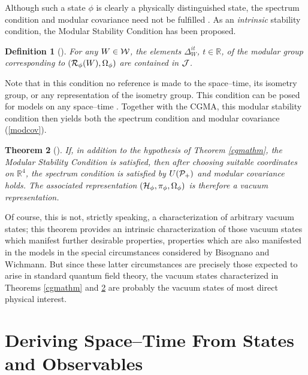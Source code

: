 \documentclass[12pt]{article}
\newtheorem{theorem}{Theorem}[section]
\newtheorem{definition}[theorem]{Definition}
\def\Hs{{\cal H}}
\def\Js{{\cal J}}
\def\Ps{{\cal P}}
\def\Rs{{\cal R}}
\def\Ws{{\cal W}}
\def\RR{{\mathbb R}}
\begin{document}
     Although such a state $\phi$ is clearly a physically
distinguished state, the spectrum condition and modular covariance
need not be fulfilled \cite{BDFS}.  As an {\it intrinsic} stability
condition, the Modular Stability Condition has been proposed.

\begin{definition} [\cite{BDFS}]
For any $W \in \Ws$, the elements $\Delta_W^{it}$, $t \in \RR$,
of the modular group corresponding to $(\Rs_\phi(W),\Omega_\phi)$
are contained in $\Js$.
\end{definition}

     Note that in this condition no reference is made to the
space--time, its isometry group, or any representation of the isometry
group.  This condition can be posed for models on any space--time
\cite{BDFS}. Together with the CGMA, this modular stability condition
then yields both the spectrum condition and modular covariance
(\ref{modcov}).

\begin{theorem} [\cite{BDFS,BS3}] \label{mscthm}
If, in addition to the hypothesis of Theorem \ref{cgmathm}, the Modular 
Stability Condition is satisfied, then after choosing suitable coordinates
on $\RR^4$, the spectrum condition is satisfied by $U(\Ps_+)$ and
modular covariance holds. The associated representation 
$(\Hs_\phi,\pi_\phi,\Omega_\phi)$ is therefore a vacuum representation.
\end{theorem}

     Of course, this is not, strictly speaking, a characterization of
arbitrary vacuum states; this theorem provides an intrinsic
characterization of those vacuum states which manifest further
desirable properties, properties which are also manifested in the
models in the special circumstances considered by Bisognano and
Wichmann.  But since these latter circumstances are precisely those expected
to arise in standard quantum field theory, the vacuum states
characterized in Theorems \ref{cgmathm} and \ref{mscthm} are probably
the vacuum states of most direct physical interest.



\section{Deriving Space--Time From States and Observables}
\label{derive}
\end{document}
